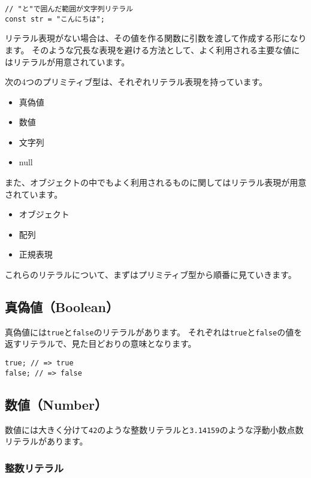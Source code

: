 \begin{lstlisting}
// "と"で囲んだ範囲が文字列リテラル
const str = "こんにちは";
\end{lstlisting}

リテラル表現がない場合は、その値を作る関数に引数を渡して作成する形になります。
そのような冗長な表現を避ける方法として、よく利用される主要な値にはリテラルが用意されています。

次の4つのプリミティブ型は、それぞれリテラル表現を持っています。

\begin{itemize}
\item
  真偽値
\item
  数値
\item
  文字列
\item
  null
\end{itemize}

また、オブジェクトの中でもよく利用されるものに関してはリテラル表現が用意されています。

\begin{itemize}
\item
  オブジェクト
\item
  配列
\item
  正規表現
\end{itemize}

これらのリテラルについて、まずはプリミティブ型から順番に見ていきます。

\hypertarget{boolean}{%
\subsection{真偽値（Boolean）}\label{boolean}}

真偽値には\texttt{true}と\texttt{false}のリテラルがあります。
それぞれは\texttt{true}と\texttt{false}の値を返すリテラルで、見た目どおりの意味となります。

\begin{lstlisting}
true; // => true
false; // => false
\end{lstlisting}

\hypertarget{number}{%
\subsection{数値（Number）}\label{number}}

数値には大きく分けて\texttt{42}のような整数リテラルと\texttt{3.14159}のような浮動小数点数リテラルがあります。

\hypertarget{integer-literal}{%
\subsubsection{整数リテラル}\label{integer-literal}}

